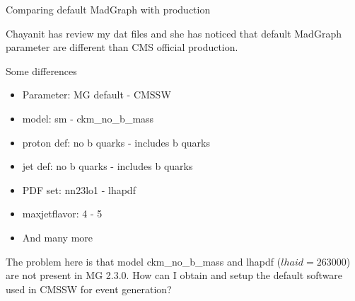\documentclass[8pt]{beamer}
\begin{document}
\begin{frame}{Comparing default MadGraph with production}

Chayanit has review my dat files and she has noticed that default MadGraph parameter are different than CMS official production.

\begin{block}{Some differences}

\begin{itemize}
  \item Parameter: MG default - CMSSW
  \item model: sm - ckm\_no\_b\_mass
  \item proton def: no b quarks - includes b quarks
  \item jet def: no b quarks - includes b quarks
  \item PDF set: nn23lo1 - lhapdf
  \item maxjetflavor: 4 - 5
  \item And many more
\end{itemize}

\end{block}

The problem here is that model ckm\_no\_b\_mass and lhapdf ($lhaid=263000$) are not present in MG 2.3.0. How can I obtain and setup the default software used in CMSSW for event generation?

\end{frame}
\end{document}
